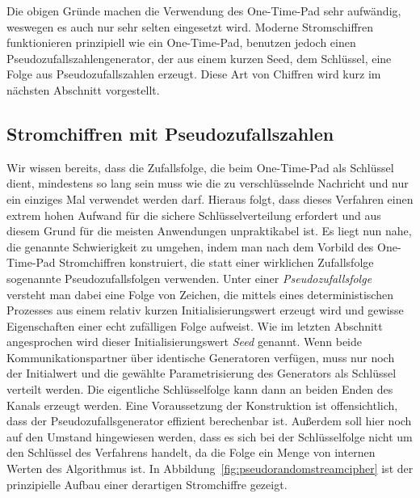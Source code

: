 Die obigen Gründe machen die Verwendung des One-Time-Pad sehr aufwändig, weswegen es auch nur sehr selten eingesetzt wird. Moderne Stromschiffren funktionieren
prinzipiell wie ein One-Time-Pad, benutzen jedoch einen Pseudozufallszahlengenerator, der aus einem kurzen Seed, dem Schlüssel, eine Folge aus
Pseudozufallszahlen erzeugt. Diese Art von Chiffren wird kurz im nächsten Abschnitt vorgestellt.

\subsection{Stromchiffren mit Pseudozufallszahlen}
\label{pseudorandomstreamcipher}

Wir wissen bereits, dass die Zufallsfolge, die beim One-Time-Pad als Schlüssel dient,
 mindestens so lang sein muss wie die zu verschlüsselnde Nachricht und nur ein einziges Mal verwendet werden darf. Hieraus folgt, dass dieses Verfahren einen
 extrem hohen Aufwand für die sichere Schlüsselverteilung erfordert und aus diesem Grund für die meisten Anwendungen unpraktikabel ist. Es liegt nun nahe, die
 genannte Schwierigkeit zu umgehen, indem man nach dem Vorbild des One-Time-Pad Stromchiffren konstruiert, die statt einer wirklichen Zufallsfolge sogenannte
 Pseudozufallsfolgen verwenden. Unter einer \emph{Pseudozufallsfolge} versteht man dabei eine Folge von Zeichen, die mittels eines deterministischen Prozesses
 aus einem relativ kurzen Initialisierungswert erzeugt wird und gewisse Eigenschaften einer echt zufälligen Folge aufweist. Wie im letzten Abschnitt
 angesprochen wird dieser Initialisierungswert \emph{Seed} genannt. Wenn beide Kommunikationspartner über identische Generatoren verfügen, muss nur noch der
 Initialwert und die gewählte Parametrisierung des Generators als Schlüssel verteilt werden. Die eigentliche Schlüsselfolge kann dann an beiden Enden des
 Kanals erzeugt werden. Eine Voraussetzung der Konstruktion ist offensichtlich, dass der Pseudozufallsgenerator effizient berechenbar ist. Außerdem soll hier
 noch auf den Umstand hingewiesen werden, dass es sich bei der Schlüsselfolge nicht um den Schlüssel des Verfahrens handelt, da die Folge ein Menge von internen
 Werten des Algorithmus ist. In Abbildung~\ref{fig:pseudorandomstreamcipher} ist der prinzipielle Aufbau einer derartigen Stromchiffre gezeigt.

